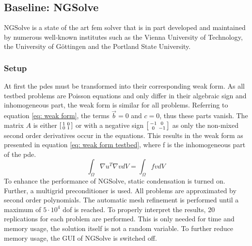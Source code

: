 \documentclass[./\jobname.tex]{subfiles}
\begin{document}
\subsection{Baseline: NGSolve}
\label{chap:fem_baseline_results}
NGSolve \cite{schoberl_ngsolvengsolve_2020} is a state of the art \gls{fem} solver that is in part developed and maintained by numerous well-known institutes such as the Vienna University of Technology, the University of Göttingen and the Portland State University. 
\subsubsection{Setup}
At first the \gls{pde}s must be transformed into their corresponding weak form. As all testbed problems are Poisson equations and only differ in their algebraic sign and inhomogeneous part, the weak form is similar for all problems. Referring to equation \eqref{eq: weak form}, the terms $\vec{b} = 0$ and $c = 0$, thus these parts vanish. The matrix $A$ is either $\begin{bsmallmatrix} 1 & 0 \\ 0 & 1 \end{bsmallmatrix}$ or with a negative sign $\begin{bsmallmatrix} -1 & 0 \\ 0 & -1 \end{bsmallmatrix}$ as only the non-mixed second order derivatives occur in the equations. This results in the weak form as presented in equation \eqref{eq: weak form testbed}, where f is the inhomogeneous part of the \gls{pde}.
\begin{equation}
\label{eq: weak form testbed}
\int_{\Omega} \nabla u^T \nabla v dV = \int_{\Omega} f v dV
\end{equation}
To enhance the performance of NGSolve, static condensation is turned on. Further, a multigrid preconditioner is used. All problems are approximated by second order polynomials. The automatic mesh refinement is performed until a maximum of $5 \cdot 10^4$ \gls{dof} is reached. To properly interpret the results, 20 replications for each problem are performed. This is only needed for time and memory usage, the solution itself is not a random variable. To further reduce memory usage, the GUI of NGSolve is switched off. 
\end{document}

